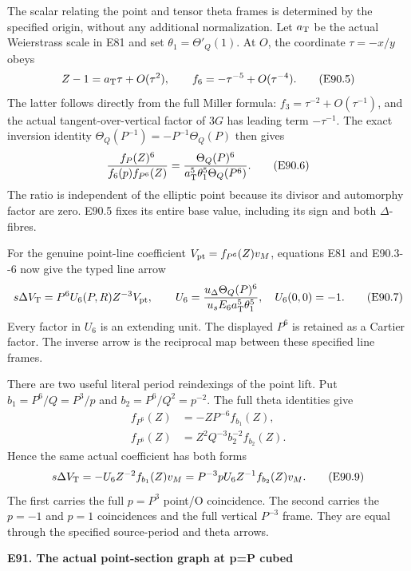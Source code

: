 The scalar relating the point and tensor theta frames
is determined by the specified origin, without any
additional normalization. Let \(a_{\rm T}\) be the
actual Weierstrass scale in E81 and set
\(\theta_1=\Theta'_Q(1)\). At \(O\), the coordinate
\(\tau=-x/y\) obeys
\[
 Z-1=a_{\rm T}\tau+O(\tau^2),\qquad
 f_6=-\tau^{-5}+O(\tau^{-4}).
 \tag{E90.5}
\]
The latter follows directly from the full Miller
formula: \(f_3=\tau^{-2}+O(\tau^{-1})\), and the
actual tangent-over-vertical factor of \(3G\) has
leading term \(-\tau^{-1}\).
The exact inversion identity
\(\Theta_Q(P^{-1})=-P^{-1}\Theta_Q(P)\) then gives
\[
 \frac{f_P(Z)^6}{f_6(p)f_{P^6}(Z)}
 =\frac{\Theta_Q(P)^6}
 {a_{\rm T}^5\theta_1^5\Theta_Q(P^6)}.
 \tag{E90.6}
\]
The ratio is independent of the elliptic point because
its divisor and automorphy factor are zero. E90.5
fixes its entire base value, including its sign and
both \(\Delta\)-fibres.

For the genuine point-line coefficient
\(V_{\rm pt}=f_{P^6}(Z)v_M\), equations E81 and
E90.3-\/-6 now give the typed line arrow
\[
 s\Delta V_{\rm T}
 =P^6U_6(P,R)Z^{-3}V_{\rm pt},\qquad
 U_6=\frac{u_\Delta\Theta_Q(P)^6}
 {u_sE_6a_{\rm T}^5\theta_1^5},\quad U_6(0,0)=-1.
 \tag{E90.7}
\]
Every factor in \(U_6\) is an extending unit. The
displayed \(P^6\) is retained as a Cartier factor.
The inverse arrow is the reciprocal map between
these specified line frames.

There are two useful literal period reindexings of
the point lift. Put \(b_1=P^6/Q=P^3/p\) and
\(b_2=P^6/Q^2=p^{-2}\). The full theta identities
give
\[
\begin{aligned}
 f_{P^6}(Z)&=-ZP^{-6}f_{b_1}(Z),\\
 f_{P^6}(Z)&=Z^2Q^{-3}b_2^{-2}f_{b_2}(Z).
\end{aligned}                                                 \tag{E90.8}
\]
Hence the same actual coefficient has both forms
\[
 s\Delta V_{\rm T}
 =-U_6Z^{-2}f_{b_1}(Z)v_M
 =P^{-3}pU_6Z^{-1}f_{b_2}(Z)v_M.
 \tag{E90.9}
\]
The first carries the full \(p=P^3\) point/O
coincidence. The second carries the \(p=-1\) and
\(p=1\) coincidences and the full vertical
\(P^{-3}\) frame. They are equal through the
specified source-period and theta arrows.

\par

\medskip\noindent\textbf{E91. The actual point-section graph at p=P cubed}

\par\nobreak


